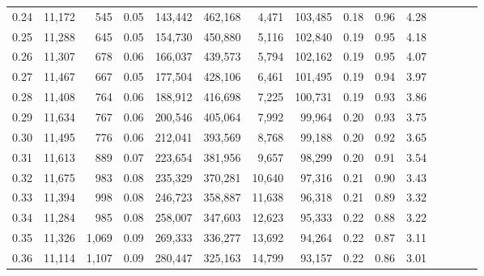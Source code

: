 \begin{tabular}{rrrcrrrrrrrrrrr}
0.24 &  11,172 &    545 &                                       0.05 &  143,442 &  462,168 &    4,471 &  103,485 &  0.18 &  0.96 &                         4.28 \\
0.25 &  11,288 &    645 &                                       0.05 &  154,730 &  450,880 &    5,116 &  102,840 &  0.19 &  0.95 &                         4.18 \\
0.26 &  11,307 &    678 &                                       0.06 &  166,037 &  439,573 &    5,794 &  102,162 &  0.19 &  0.95 &                         4.07 \\
0.27 &  11,467 &    667 &                                       0.05 &  177,504 &  428,106 &    6,461 &  101,495 &  0.19 &  0.94 &                         3.97 \\
0.28 &  11,408 &    764 &                                       0.06 &  188,912 &  416,698 &    7,225 &  100,731 &  0.19 &  0.93 &                         3.86 \\
0.29 &  11,634 &    767 &                                       0.06 &  200,546 &  405,064 &    7,992 &   99,964 &  0.20 &  0.93 &                         3.75 \\
0.30 &  11,495 &    776 &                                       0.06 &  212,041 &  393,569 &    8,768 &   99,188 &  0.20 &  0.92 &                         3.65 \\
0.31 &  11,613 &    889 &                                       0.07 &  223,654 &  381,956 &    9,657 &   98,299 &  0.20 &  0.91 &                         3.54 \\
0.32 &  11,675 &    983 &                                       0.08 &  235,329 &  370,281 &   10,640 &   97,316 &  0.21 &  0.90 &                         3.43 \\
0.33 &  11,394 &    998 &                                       0.08 &  246,723 &  358,887 &   11,638 &   96,318 &  0.21 &  0.89 &                         3.32 \\
0.34 &  11,284 &    985 &                                       0.08 &  258,007 &  347,603 &   12,623 &   95,333 &  0.22 &  0.88 &                         3.22 \\
0.35 &  11,326 &  1,069 &                                       0.09 &  269,333 &  336,277 &   13,692 &   94,264 &  0.22 &  0.87 &                         3.11 \\
0.36 &  11,114 &  1,107 &                                       0.09 &  280,447 &  325,163 &   14,799 &   93,157 &  0.22 &  0.86 &                         3.01 \\

\end{tabular}
